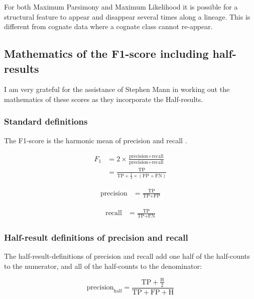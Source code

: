 \documentclass[a4paper,10pt]{article} %
\begin{document}
For both Maximum Parsimony and Maximum Likelihood it is possible for a structural feature to appear and disappear several times along a lineage. This is different from cognate data where a cognate class cannot re-appear.

\subsection{Mathematics of the F1-score including half-results}
\label{math_supp}

I am very grateful for the assistance of Stephen Mann in working out the mathematics of these scores as they incorporate the Half-results.

\subsubsection{Standard definitions}\label{sec:standard}

The F1-score is the harmonic mean of precision and recall \citep{van1979information}.

\begin{align*}
    F_1 &= 2\times\frac{\text{precision}\times\text{recall}}
            {\text{precision} + \text{recall}}\\
        &= \frac{\text{TP}}
            {\text{TP}+\frac{1}{2}\times(\text{FP}+\text{FN})}
\end{align*}

\begin{align*}
    \text{precision} 
        &= \frac{\text{TP}}
            {\text{TP}+\text{FP}}
\end{align*}

\begin{align*}
    \text{recall} 
        &= \frac{\text{TP}}
            {\text{TP}+\text{FN}}
\end{align*}

\subsubsection{Half-result definitions of precision and recall}\label{sec:halfsies}

The half-result-definitions of precision and recall add one half of the half-counts to the numerator, and all of the half-counts to the denominator:

\begin{equation*}
    \text{precision}_{\text{half}} 
        = \frac{\text{TP}+\frac{\text{H}}{2}}
            {\text{TP}+\text{FP}+\text{H}}
\end{equation*}
\end{document}
